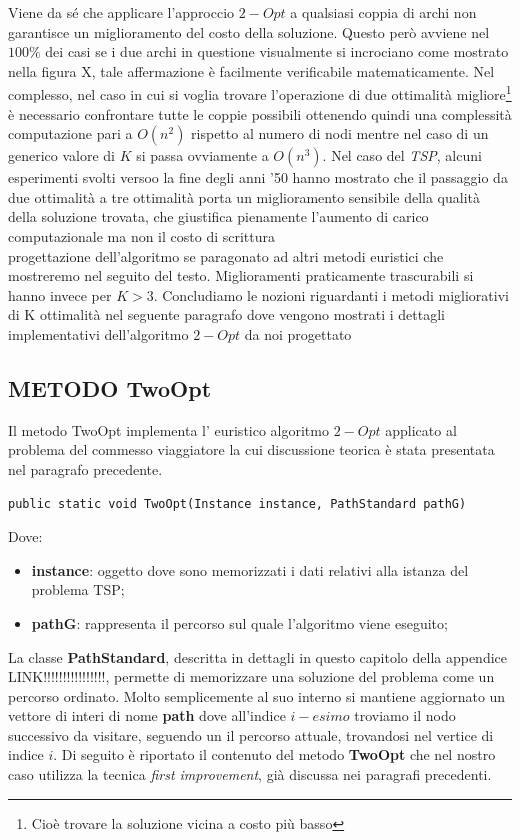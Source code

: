 \documentclass[11pt]{article}
\begin{document}
Viene da sé che applicare l'approccio $2-Opt$ a qualsiasi coppia di archi non garantisce un miglioramento del costo della soluzione. Questo però avviene nel $100\%$ dei casi se i due archi in questione visualmente si incrociano come mostrato nella figura X, tale affermazione è facilmente verificabile matematicamente.
Nel complesso, nel caso in cui si voglia trovare l'operazione di due ottimalità migliore\footnote{Cioè trovare la soluzione vicina a costo più basso} è necessario confrontare tutte le coppie possibili ottenendo quindi una complessità computazione pari a $O(n^2)$ rispetto al numero di nodi mentre nel caso di un generico valore di $K$ si passa ovviamente a $O(n^3)$.
Nel caso del \textit{TSP}, alcuni esperimenti svolti versoo la fine degli anni '50 hanno mostrato che il passaggio da due ottimalità a tre ottimalità porta un miglioramento sensibile della qualità della soluzione trovata, che giustifica pienamente l'aumento di carico computazionale ma non il costo di scrittura\\progettazione dell'algoritmo se paragonato ad altri metodi euristici che mostreremo nel seguito del testo. Miglioramenti praticamente trascurabili si hanno invece per $K > 3$. 
Concludiamo le nozioni riguardanti i metodi migliorativi di K ottimalità nel seguente paragrafo dove vengono mostrati i dettagli implementativi dell'algoritmo $2-Opt$ da noi progettato

\subsection*{METODO TwoOpt}

Il metodo TwoOpt implementa l' euristico algoritmo $2-Opt$ applicato al problema del commesso viaggiatore la cui discussione teorica è stata presentata nel paragrafo precedente.

\begin{lstlisting}
public static void TwoOpt(Instance instance, PathStandard pathG)
\end{lstlisting}

Dove:

\begin{itemize}
    \item \textbf{instance}: oggetto dove sono memorizzati i dati relativi alla istanza del problema TSP;
    \item \textbf{pathG}: rappresenta il percorso sul quale l'algoritmo viene eseguito;
\end{itemize}

La classe \textbf{PathStandard}, descritta in dettagli in questo capitolo della appendice LINK!!!!!!!!!!!!!!!!, permette di memorizzare una soluzione del problema come un percorso ordinato. Molto semplicemente al suo interno si mantiene aggiornato un vettore di interi di nome \textbf{path} dove all'indice $i-esimo$ troviamo il nodo successivo da visitare, seguendo un il percorso attuale, trovandosi nel vertice di indice $i$.
Di seguito è riportato il contenuto del metodo \textbf{TwoOpt} che nel nostro caso utilizza la tecnica \textit{first improvement}, già discussa nei paragrafi precedenti.
\end{document}
